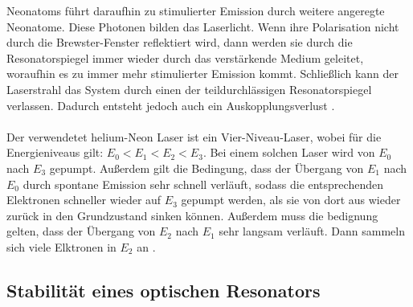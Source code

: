 Neonatoms führt daraufhin zu stimulierter Emission durch weitere angeregte Neonatome. 
Diese Photonen bilden das Laserlicht. Wenn ihre Polarisation nicht durch die 
Brewster-Fenster reflektiert wird, dann werden sie durch die Resonatorspiegel 
immer wieder durch das verstärkende Medium geleitet, woraufhin es zu immer mehr
stimulierter Emission kommt. Schließlich kann der Laserstrahl das System durch einen 
der teildurchlässigen Resonatorspiegel verlassen. Dadurch entsteht jedoch auch ein 
Auskopplungsverlust \cite{2}.\\\\
Der verwendetet helium-Neon Laser ist ein Vier-Niveau-Laser, wobei für die 
Energieniveaus gilt: $E_{\text{0}} <E_{\text{1}} < E_{\text{2}} < E_{\text{3}}$.
Bei einem solchen Laser wird von $E_{\text{0}}$ nach $E_{\text{3}}$ gepumpt. 
Außerdem gilt die Bedingung, dass der Übergang von $E_{\text{1}}$ nach $E_{\text{0}}$
durch spontane Emission sehr schnell verläuft, sodass die entsprechenden 
Elektronen schneller wieder auf $E_{\text{3}}$ gepumpt werden, als sie von dort 
aus wieder zurück in den Grundzustand sinken können. Außerdem muss die 
bedignung gelten, dass der Übergang von $E_{\text{2}}$ nach $E_{\text{1}}$
sehr langsam verläuft. Dann sammeln sich viele Elktronen in $E_{\text{2}}$ an \cite{3}.

\subsection{Stabilität eines optischen Resonators}

